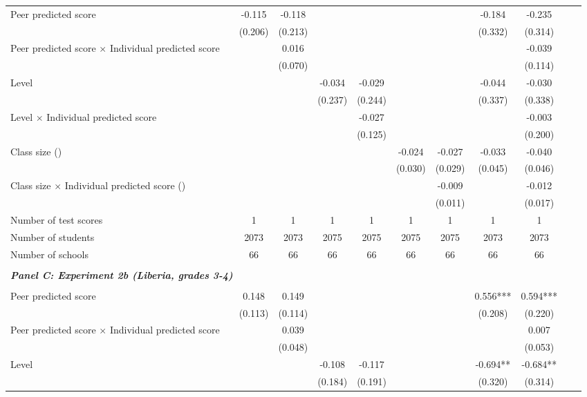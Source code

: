 \begin{center}
\begin{scriptsize}
\begin{threeparttable}
\begin{tabular} {@{} l l c c c c c c c c c c  @{}}
\\
Peer predicted score &  & -0.115 & -0.118 &  &  &  &  & -0.184 & -0.235 \\
                 &  & (0.206) & (0.213) &  &  &  &  & (0.332) & (0.314) \\
Peer predicted score $\times$ Individual predicted score &  &  & 0.016 &  &  &  &  &  & -0.039 \\
                 &  &  & (0.070) &  &  &  &  &  & (0.114) \\
Level &  &  &  & -0.034 & -0.029 &  &  & -0.044 & -0.030 \\
                 &  &  &  & (0.237) & (0.244) &  &  & (0.337) & (0.338) \\
Level $\times$ Individual predicted score &  &  &  &  & -0.027 &  &  &  & -0.003 \\
                 &  &  &  &  & (0.125) &  &  &  & (0.200) \\
Class size (\times 10) &  &  &  &  &  & -0.024 & -0.027 & -0.033 & -0.040 \\
                 &  &  &  &  &  & (0.030) & (0.029) & (0.045) & (0.046) \\
Class size $\times$ Individual predicted score (\times 10) &  &  &  &  &  &  & -0.009 &  & -0.012 \\
                 &  &  &  &  &  &  & (0.011) &  & (0.017) \\
\midrule
Number of test scores &  & 1 & 1 & 1 & 1 & 1 & 1 & 1 & 1 \\
Number of students &  & 2073 & 2073 & 2075 & 2075 & 2075 & 2075 & 2073 & 2073 \\
Number of schools &  & 66 & 66 & 66 & 66 & 66 & 66 & 66 & 66 \\
 \midrule
\\
\multicolumn{3}{l}{\textbf{\textit{Panel C: Experiment 2b (Liberia, grades 3-4)}}} \\
\\
Peer predicted score &  & 0.148 & 0.149 &  &  &  &  & 0.556*** & 0.594*** \\
                 &  & (0.113) & (0.114) &  &  &  &  & (0.208) & (0.220) \\
Peer predicted score $\times$ Individual predicted score &  &  & 0.039 &  &  &  &  &  & 0.007 \\
                 &  &  & (0.048) &  &  &  &  &  & (0.053) \\
Level &  &  &  & -0.108 & -0.117 &  &  & -0.694** & -0.684** \\
                 &  &  &  & (0.184) & (0.191) &  &  & (0.320) & (0.314) \\

\end{tabular}
\end{threeparttable}
\end{scriptsize}
\end{center}
